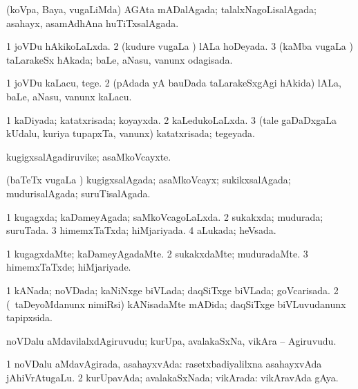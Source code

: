 \bentry
{} 
\gl{\gu}
\expl{}
\bmng
(koVpa, Baya, \mo vugaLiMda) AGAta mADalAgada; talalxNagoLisalAgada; asahayx, asamAdhAna huTiTxsalAgada. 
\emng
\eentry

\bentry
{} 
\gl{\gu}
\expl{}
\bmng
\bnum
\num{1} joVDu hAkikoLaLxda. 
\num{2} (kudure \mo vugaLa \vi) lALa hoDeyada. 
\num{3} (kaMba \mo vugaLa \vi) taLarakeSx hAkada; baLe, aNasu, \mo vanunx odagisada. 
\enum
\emng
\eentry

\bentry
{} 
\gl{\sakirx}
\expl{}
\bmng
\bnum
\num{1} joVDu kaLacu, tege. 
\num{2} (pAdada yA bauDada taLarakeSxgAgi hAkida) lALa, baLe, aNasu, \mo vanunx kaLacu. 
\enum
\emng
\eentry

\bentry
{} 
\gl{\gu}
\expl{}
\bmng
\bnum
\num{1} kaDiyada; katatxrisada; koyayxda. 
\num{2} kaLedukoLaLxda. 
\num{3} (tale gaDaDxgaLa kUdalu, kuriya tupapxTa, \mo vanunx) katatxrisada; tegeyada. 
\enum
\emng
\eentry

\bentry
{} 
\gl{\nA}
\expl{}
\bmng
kugigxsalAgadiruvike; asaMkoVcayxte. 
\emng
\eentry

\bentry
{} 
\gl{\gu}
\expl{}
\bmng
(baTeTx \mo vugaLa \vi) kugigxsalAgada; asaMkoVcayx; sukikxsalAgada; mudurisalAgada; suruTisalAgada. 
\emng
\eentry

\bentry
{} 
\gl{\gu}
\expl{}
\bmng
\bnum
\num{1} kugagxda; kaDameyAgada; saMkoVcagoLaLxda. 
\num{2} sukakxda; mudurada; suruTada. 
\num{3} himemxTaTxda; hiMjariyada. 
\num{4} aLukada; heVsada. 
\enum
\emng
\eentry

\bentry
{} 
\gl{\kirxvi}
\expl{}
\bmng
\bnum
\num{1} kugagxdaMte; kaDameyAgadaMte. 
\num{2} sukakxdaMte; muduradaMte. 
\num{3} himemxTaTxde; hiMjariyade. 
\enum
\emng
\eentry

\bentry
{} 
\gl{\gu}
\expl{}
\bmng
\bnum
\num{1} kANada; noVDada; kaNiNxge biVLada; daqSiTxge biVLada; goVcarisada. 
\num{2} (\kanmu\ taDeyoMdanunx nimiRsi) kANisadaMte mADida; daqSiTxge biVLuvudanunx tapipxsida. 
\enum
\emng
\eentry

\bentry
{} 
\gl{\nA}
\expl{}
\bmng
noVDalu aMdavilalxdAgiruvudu; kurUpa, avalakaSxNa, vikAra -- Agiruvudu. 
\emng
\eentry

\bentry
{} 
\gl{\gu}
\expl{}
\bmng
\bnum
\num{1} noVDalu aMdavAgirada, asahayxvAda:  rasetxbadiyalilxna asahayxvAda jAhiVrAtugaLu. 
\num{2} kurUpavAda; avalakaSxNada; vikArada:  vikAravAda gAya. 
\enum
\emng
\eentry

